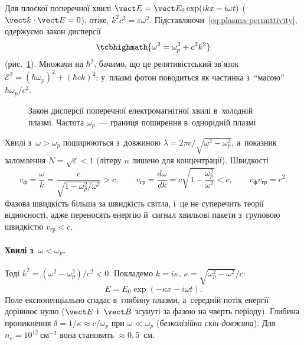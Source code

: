 Для плоскої поперечної хвилі $\vect E=\vect E_0\exp(ikx-i\omega t)$ ($\vect k\cdot\vect
E=0$), отже, $k^2c^2=\varepsilon\omega^2$. Підставляючи~\eqref{eq:plasma-permittivity}, одержуємо
закон дисперсії
\begin{equation}\label{eq:plasma-dispersion}
	\tcbhighmath{\omega^2=\omega_p^2+c^2k^2}
\end{equation}
(рис.~\ref{pic:plasma-dispersion}). Множачи на $\hbar^2$, бачимо, що це релятивістський
зв'язок $\mathcal E^2=(\hbar\omega_p)^2+(\hbar ck)^2$: у~плазмі фотон поводиться як
частинка з~\enquote{масою} $\hbar\omega_p/c^2$.

\begin{figure}[ht]\centering
	\caption{Закон дисперсії поперечної електромагнітної хвилі в~холодній плазмі. Частота
	$\omega_p$~--- границя поширення в~однорідній плазмі}
	\label{pic:plasma-dispersion}
\end{figure}

Хвилі з~$\omega>\omega_p$ поширюються з~довжиною $\lambda=2\pi
c/\sqrt{\omega^2-\omega_p^2}$, а~показник заломлення $N=\sqrt\varepsilon<1$ (літеру $n$ лишено для концентрації). Швидкості
\begin{equation*}
	v_{\mathrm{ф}}=\frac\omega k=\frac c{\sqrt{1-\omega_p^2/\omega^2}}>c,\qquad
	v_{\mathrm{гр}}=\frac{d\omega}{dk}=c\sqrt{1-\frac{\omega_p^2}{\omega^2}}<c,\qquad
	v_{\mathrm{ф}}v_{\mathrm{гр}}=c^2.
\end{equation*}
Фазова швидкість більша за швидкість світла, і~це не суперечить теорії відносності, адже
переносять енергію й~сигнал хвильові пакети з~груповою швидкістю $v_{\mathrm{гр}}<c$.

\paragraph{Хвилі з~$\omega<\omega_p$.}
Тоді $k^2=(\omega^2-\omega_p^2)/c^2<0$. Покладемо $k=i\kappa$,
$\kappa=\sqrt{\omega_p^2-\omega^2}/c$:
\begin{equation*}
	E=E_0\exp(-\kappa x-i\omega t).
\end{equation*}
Поле експоненціально спадає в~глибину плазми, а~середній потік енергії дорівнює нулю ($\vect E$ і~$\vect B$ зсунуті за фазою на чверть періоду).
Глибина проникнення $\delta=1/\kappa\approx c/\omega_p$ при $\omega\ll\omega_p$
(\emph{безколізійна скін-довжина}). Для $n_e=10^{12}~\mathrm{см}^{-3}$ вона становить
$\approx0{,}5$~см.

